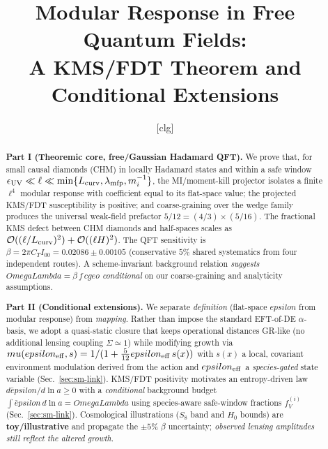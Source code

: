 \documentclass[aps,prd,onecolumn,superscriptaddress,nofootinbib]{revtex4-2}
\def\OmL{OmegaLambda}%
\def\cgeo{cgeo}%
\def\eps{epsilon}%
\def\mu{mu}%
\def\alpha{alpha}%
\def\alpha_M{alphaM}%
\def\Omega_\Lambda{OmegaLambda}%
\providecommand{\OmL}{\Omega_\Lambda}
\providecommand{\cgeo}{c_{\rm geo}}
\providecommand{\eps}{\varepsilon}
\begin{document}
\title{Modular Response in Free Quantum Fields:\\
A KMS/FDT Theorem and Conditional Extensions}

\author{[clg]}
\affiliation{[Institutions]}
\date{}

\begin{abstract}
\textbf{Part I (Theoremic core, free/Gaussian Hadamard QFT).} We prove that, for small causal diamonds (CHM) in locally Hadamard states and within a safe window \(\epsilon_{\rm UV}\ll\ell\ll \min\{L_{\rm curv},\lambda_{\rm mfp},m_i^{-1}\}\), the MI/moment-kill projector isolates a finite \(\ell^4\) modular response with coefficient equal to its flat-space value; the projected KMS/FDT susceptibility is positive; and coarse-graining over the wedge family produces the universal weak-field prefactor \(5/12=(4/3)\times(5/16)\). The fractional KMS defect between CHM diamonds and half-spaces scales as \(\mathcal O((\ell/L_{\rm curv})^2)+\mathcal O((\ell H)^2)\). The QFT sensitivity is \(\beta=2\pi C_T I_{00}=0.02086\pm 0.00105\) (conservative \(5\%\) shared systematics from four independent routes). A scheme-invariant background relation \emph{suggests} \(\OmL=\beta\, f\,\cgeo\) \emph{conditional} on our coarse-graining and analyticity assumptions.

\smallskip
\textbf{Part II (Conditional extensions).} We separate \emph{definition} (flat-space \(\eps\) from modular response) from \emph{mapping}. Rather than impose the standard EFT-of-DE \(\alpha\)-basis, we adopt a quasi-static closure that keeps operational distances GR-like (no additional lensing coupling \(\Sigma\simeq 1\)) while modifying growth via \(\mu(\eps_{\rm eff},s)=1/(1+\tfrac{5}{12}\eps_{\rm eff}\,s(x))\) with \(s(x)\) a local, covariant environment modulation derived from the action and \(\eps_{\rm eff}\) a \emph{species-gated} state variable (Sec.~\ref{sec:sm-link}). KMS/FDT positivity motivates an entropy-driven law \(d\bar\eps/d\ln a\ge 0\) with a \emph{conditional} background budget \(\int \bar\eps\,d \ln a=\OmL\) using species-aware safe-window fractions \(f_V^{(i)}\) (Sec.~\ref{sec:sm-link}). Cosmological illustrations (\(S_8\) band and \(H_0\) bounds) are \textbf{toy/illustrative} and propagate the \(\pm5\%\) \(\beta\) uncertainty; \emph{observed lensing amplitudes still reflect the altered growth}.


\end{abstract}
\end{document}
